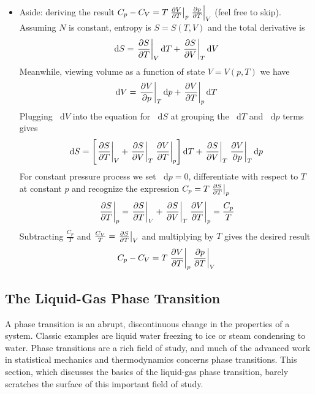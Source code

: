 \documentclass[11pt, a4paper]{article}
\newcommand{\diff}{\mathop{}\!\mathrm{d}} %
\begin{document}
\begin{itemize}
	\item Aside: deriving the result $ C_{p} - C_{V} = T \eval{\pdv{V}{T}}_{p}\eval{\pdv{p}{T}}_{V} $ (feel free to skip). Assuming $ N $ is constant, entropy is $ S = S(T, V) $ and the total derivative is
	\begin{equation*}
		\diff S = \eval{\pdv{S}{T}}_{V} \diff T + \eval{\pdv{S}{V}}_{T} \diff V
	\end{equation*}
	Meanwhile, viewing volume as a function of state $ V = V(p, T) $ we have
	\begin{equation*}
		\diff V = \eval{\pdv{V}{p}}_{T} \diff p + \eval{\pdv{V}{T}}_{p} \diff T
	\end{equation*}
	Plugging $ \diff V $ into the equation for $ \diff S $ at grouping the $ \diff T $ and $ \diff p $ terms gives
	\begin{equation*}
	 \diff S = \left[\eval{\pdv{S}{T}}_{V} + \eval{\pdv{S}{V}}_{T} \eval{\pdv{V}{T}}_{p}  \right] \diff T + \eval{\pdv{S}{V}}_{T}\eval{\pdv{V}{p}}_{T}  \diff p
	\end{equation*}
	For constant pressure process we set $ \diff p = 0 $, differentiate with respect to $ T $ at constant $ p $ and recognize the expression $ C_{p} = T \eval{\pdv{S}{T}}_{p} $
	\begin{equation*}
		\eval{\pdv{S}{T}}_{p} = \eval{\pdv{S}{T}}_{V} + \eval{\pdv{S}{V}}_{T} \eval{\pdv{V}{T}}_{p} = \frac{C_{p}}{T}
	\end{equation*}
	Subtracting $ \frac{C_{p}}{T} $ and $ \frac{C_{V}}{T} = \eval{\pdv{S}{T}}_{V} $ and multiplying by $ T $ gives the desired result
	\begin{equation*}
		 C_{p} - C_{V} = T \eval{\pdv{V}{T}}_{p}\eval{\pdv{p}{T}}_{V}
	\end{equation*}
\end{itemize}

\subsection{The Liquid-Gas Phase Transition}
A phase transition is an abrupt, discontinuous change in the properties of a system. Classic examples are liquid water freezing to ice or steam condensing to water. Phase transitions are a rich field of study, and much of the advanced work in statistical mechanics and thermodynamics concerns phase transitions. This section, which discusses the basics of the liquid-gas phase transition, barely scratches the surface of this important field of study.
\end{document}
